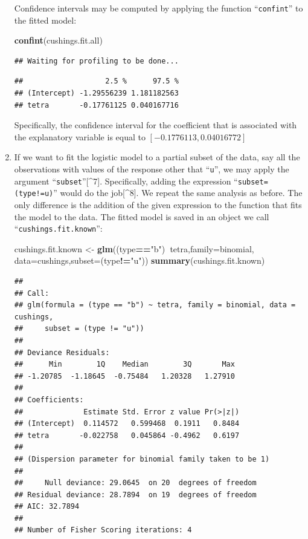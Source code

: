 \documentclass[]{krantz}
\makeatletter
\newenvironment{Shaded}{\begin{snugshade}}{\end{snugshade}}
\newcommand{\DataTypeTok}[1]{\textcolor[rgb]{0.13,0.29,0.53}{#1}}
\newcommand{\KeywordTok}[1]{\textcolor[rgb]{0.13,0.29,0.53}{\textbf{#1}}}
\newcommand{\NormalTok}[1]{#1}
\newcommand{\OperatorTok}[1]{\textcolor[rgb]{0.81,0.36,0.00}{\textbf{#1}}}
\newcommand{\StringTok}[1]{\textcolor[rgb]{0.31,0.60,0.02}{#1}}
\newenvironment{kframe}{%
\medskip{}
\setlength{\fboxsep}{.8em}
 \def\at@end@of@kframe{}%
 \ifinner\ifhmode%
  \def\at@end@of@kframe{\end{minipage}}%
  \begin{minipage}{\columnwidth}%
 \fi\fi%
 \def\FrameCommand##1{\hskip\@totalleftmargin \hskip-\fboxsep
 \colorbox{shadecolor}{##1}\hskip-\fboxsep
     \hskip-\linewidth \hskip-\@totalleftmargin \hskip\columnwidth}%
 \MakeFramed {\advance\hsize-\width
   \@totalleftmargin\z@ \linewidth\hsize
   \@setminipage}}%
 {\par\unskip\endMakeFramed%
 \at@end@of@kframe}
\renewenvironment{Shaded}{\begin{kframe}}{\end{kframe}}
\theoremstyle{definition}
\theoremstyle{definition}
\theoremstyle{definition}
\theoremstyle{remark}
\makeatother
\begin{document}
\begin{enumerate}
  Confidence intervals may be computed by applying the function
  ``\texttt{confint}'' to the fitted model:

\begin{Shaded}
\begin{Highlighting}[]
\KeywordTok{confint}\NormalTok{(cushings.fit.all)}
\end{Highlighting}
\end{Shaded}

\begin{verbatim}
## Waiting for profiling to be done...
\end{verbatim}

\begin{verbatim}
##                   2.5 %      97.5 %
## (Intercept) -1.29556239 1.181182563
## tetra       -0.17761125 0.040167716
\end{verbatim}

  Specifically, the confidence interval for the coefficient that is
  associated with the explanatory variable is equal to
  \([-0.1776113, 0.04016772]\)
\item
  If we want to fit the logistic model
  to a partial subset of the data, say all the observations with values of
  the response other that ``\texttt{u}'', we may apply the argument ``\texttt{subset}''{[}\^{}7{]}.
  Specifically, adding the expression ``\texttt{subset=(type!=u)}'' would do the
  job{[}\^{}8{]}. We repeat the same analysis as before. The only difference is
  the addition of the given expression to the function that fits the model
  to the data. The fitted model is saved in an object we call
  ``\texttt{cushings.fit.known}'':

\begin{Shaded}
\begin{Highlighting}[]
\NormalTok{cushings.fit.known <-}\StringTok{ }\KeywordTok{glm}\NormalTok{((type}\OperatorTok{==}\StringTok{"b"}\NormalTok{)}\OperatorTok{~}\NormalTok{tetra,}\DataTypeTok{family=}\NormalTok{binomial, }\DataTypeTok{data=}\NormalTok{cushings,}\DataTypeTok{subset=}\NormalTok{(type}\OperatorTok{!=}\StringTok{"u"}\NormalTok{))}
\KeywordTok{summary}\NormalTok{(cushings.fit.known)}
\end{Highlighting}
\end{Shaded}

\begin{verbatim}
## 
## Call:
## glm(formula = (type == "b") ~ tetra, family = binomial, data = cushings, 
##     subset = (type != "u"))
## 
## Deviance Residuals: 
##      Min        1Q    Median        3Q       Max  
## -1.20785  -1.18645  -0.75484   1.20328   1.27910  
## 
## Coefficients:
##              Estimate Std. Error z value Pr(>|z|)
## (Intercept)  0.114572   0.599468  0.1911   0.8484
## tetra       -0.022758   0.045864 -0.4962   0.6197
## 
## (Dispersion parameter for binomial family taken to be 1)
## 
##     Null deviance: 29.0645  on 20  degrees of freedom
## Residual deviance: 28.7894  on 19  degrees of freedom
## AIC: 32.7894
## 
## Number of Fisher Scoring iterations: 4
\end{verbatim}


\end{enumerate}
\end{document}
